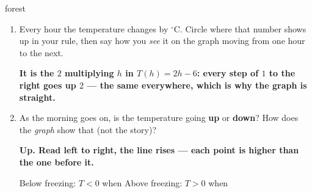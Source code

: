 \documentclass[12pt]{article}
\newcommand{\answerspace}[2]{\par\nopagebreak\noindent\begin{minipage}[t][#1][t]{\linewidth}%
  \color{keyred}\bfseries #2\end{minipage}\par}
\begin{document}
\begin{scenariobox}{forest}
\begin{enumerate}[label=\textbf{\alph*.}, start=5, leftmargin=1.8em, itemsep=4pt]
  \item Every hour the temperature changes by  $^\circ$C. Circle where that number
        shows up in your rule, then say how you \emph{see} it on the graph moving from one hour
        to the next.
        \answerspace{1.8cm}{It is the $2$ multiplying $h$ in $T(h)=2h-6$: every step of $1$ to the right goes up $2$ --- the same everywhere, which is why the graph is straight.}
  \item As the morning goes on, is the temperature going \textbf{up} or \textbf{down}? How does
        the \emph{graph} show that (not the story)?
        \answerspace{1.3cm}{Up. Read left to right, the line rises --- each point is higher than the one before it.}
        Below freezing: $T<0$ when  \qquad
        Above freezing: $T>0$ when 
\end{enumerate}
\end{scenariobox}
\end{document}
